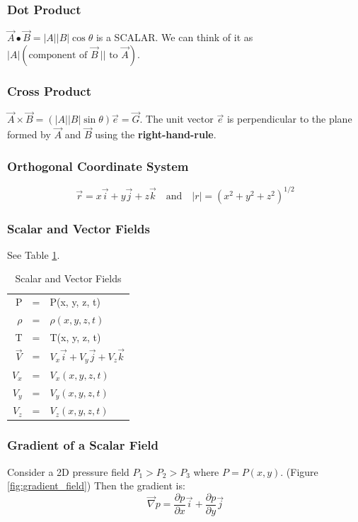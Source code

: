 \documentclass[draft=false, titlepage]{article}
\begin{document}
\subsubsection{Dot Product} $\vec{A} \bullet \vec{B} = |A||B|\cos\theta$ is a SCALAR. We can think of it as $|A|(\text{component of } \vec{B}\ || \text{ to } \vec{A})$.
\subsubsection{Cross Product} $\vec{A} \times \vec{B} = (|A||B|\sin\theta)\vec{e} = \vec{G}$. The unit vector $\vec{e}$ is perpendicular to the plane formed by $\vec{A}$ and $\vec{B}$ using the \textbf{right-hand-rule}.
\subsubsection{Orthogonal Coordinate System}
\begin{equation}
    \vec{r} = x\vec{i} + y\vec{j} + z\vec{k} \quad \text{and} \quad |r| = (x^2 + y^2 + z^2)^{1/2}
\end{equation}

\subsubsection{Scalar and Vector Fields}
See Table \ref{tab:ScalarVectorFields}.
\begin{table}[ht]
\centering\caption{Scalar and Vector Fields}
    \begin{tabular}{rcl}
    \hline
         P &=& P(x, y, z, t) \\
         $\rho$ &=& $\rho(x, y, z, t)$ \\
         T &=& T(x, y, z, t) \\
         $\vec{V}$ &=& $V_x\vec{i} + V_y\vec{j} + V_z\vec{k}$ \\
         $V_x$ &=& $V_x(x, y, z, t)$ \\
         $V_y$ &=& $V_y(x, y, z, t)$ \\
         $V_z$ &=& $V_z(x, y, z, t)$ \\
         \hline
    \end{tabular}
    \label{tab:ScalarVectorFields}
\end{table}

\subsubsection{Gradient of a Scalar Field} Consider a 2D pressure field $P_1 > P_2 > P_3$ where $P=P(x, y)$. (Figure \ref{fig:gradient_field}) Then the gradient is:
\begin{equation}
    \vec{\nabla}p = \frac{\partial p}{\partial x}\vec{i} + \frac{\partial p}{\partial y}\vec{j}
\end{equation}
\end{document}
